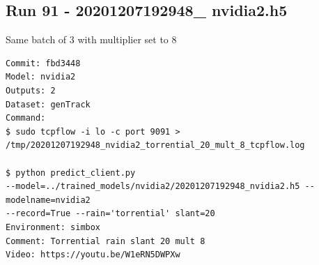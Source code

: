 \subsection{Run 91 - 20201207192948\_ nvidia2.h5 }
Same batch of 3 with multiplier set to 8
\label{app_res:91}
\begin{verbatim}
Commit: fbd3448
Model: nvidia2 
Outputs: 2
Dataset: genTrack
Command:
$ sudo tcpflow -i lo -c port 9091 > 
/tmp/20201207192948_nvidia2_torrential_20_mult_8_tcpflow.log

$ python predict_client.py
--model=../trained_models/nvidia2/20201207192948_nvidia2.h5 --modelname=nvidia2 
--record=True --rain='torrential' slant=20
Environment: simbox
Comment: Torrential rain slant 20 mult 8
Video: https://youtu.be/W1eRN5DWPXw
\end{verbatim}

